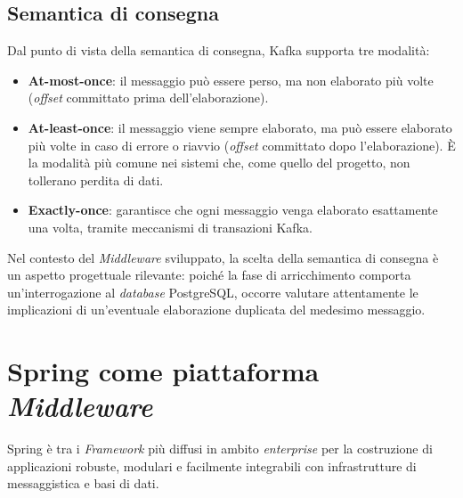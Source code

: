 \subsection{Semantica di consegna}
\label{Semantica di consegna}
Dal punto di vista della semantica di consegna, Kafka supporta tre modalità:
\begin{itemize}
    \item \textbf{At-most-once}: il messaggio può essere perso, ma non elaborato più volte (\textit{offset} committato prima dell'elaborazione).
    \item \textbf{At-least-once}: il messaggio viene sempre elaborato, ma può essere elaborato più volte in caso di errore o riavvio (\textit{offset} committato dopo l'elaborazione). È la modalità più comune nei sistemi che, come quello del progetto, non tollerano perdita di dati.
    \item \textbf{Exactly-once}: garantisce che ogni messaggio venga elaborato esattamente una volta, tramite meccanismi di transazioni Kafka.
\end{itemize}
Nel contesto del \textit{Middleware} sviluppato, la scelta della semantica di consegna è un aspetto progettuale rilevante: poiché la fase di arricchimento comporta un'interrogazione al \textit{database} PostgreSQL, occorre valutare attentamente le implicazioni di un'eventuale elaborazione duplicata del medesimo messaggio.

\section{Spring come piattaforma \textit{Middleware}}
\label{Spring Framework}
Spring è tra i \textit{\gls{Framework}} più diffusi in ambito \textit{enterprise} per la costruzione di applicazioni  robuste, modulari e facilmente integrabili con infrastrutture di messaggistica e basi di dati.

